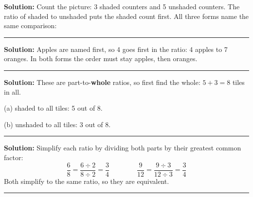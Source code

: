 \documentclass[12pt]{article}
\begin{document}



\textbf{Solution:} Count the picture: 3 shaded counters and 5 unshaded counters.
The ratio of shaded to unshaded puts the shaded count first. All three forms name
the same comparison: 

\vspace{0.3cm}\noindent\rule{\linewidth}{0.2pt}\vspace{0.3cm}


\textbf{Solution:} Apples are named first, so 4 goes first in the ratio: 4 apples
to 7 oranges. In both forms the order must stay apples, then
oranges. 

\vspace{0.3cm}\noindent\rule{\linewidth}{0.2pt}\vspace{0.3cm}


\textbf{Solution:} These are part-to-\textbf{whole} ratios, so first find the
whole: $5 + 3 = 8$ tiles in all.

(a) shaded to all tiles: 5 out of 8. 

(b) unshaded to all tiles: 3 out of 8. 

\vspace{0.3cm}\noindent\rule{\linewidth}{0.2pt}\vspace{0.3cm}


\textbf{Solution:} Simplify each ratio by dividing both parts by their greatest
common factor:
\[ \frac{6}{8} = \frac{6 \div 2}{8 \div 2} = \frac{3}{4}
\qquad\qquad
\frac{9}{12} = \frac{9 \div 3}{12 \div 3} = \frac{3}{4} \]
Both simplify to the same ratio, so they are equivalent. 

\vspace{0.3cm}\noindent\rule{\linewidth}{0.2pt}\vspace{0.3cm}
\end{document}
